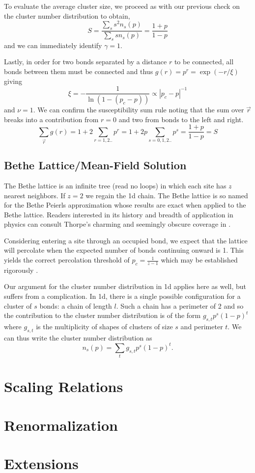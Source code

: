 To evaluate the average cluster size, we proceed as with our previous check on
the cluster number distribution to obtain,
\[S = \frac{\sum_s s^2n_s(p)}{\sum_s sn_s(p)} = \frac{1+p}{1-p}\]
and we can immediately identify $\gamma=1$.

Lastly, in order for two bonds separated by a distance $r$ to be connected, all
bonds between them must be connected and thus \(g(r) = p^r = \exp(-r/\xi)\) giving
\[\xi = -\frac{1}{\ln(1 - (p_c - p))}\propto |p_c - p|^{-1}\]
and $\nu = 1$.  We can confirm the susceptibility sum rule noting that the sum over
$\vec{r}$ breaks into a contribution from $r=0$ and two from bonds to the left and
right.
\[\sum_{\vec{r}}g(r) = 1 + 2\sum_{r=1,2..} p^r = 
1 + 2p\sum_{s=0,1,2..} p^s= \frac{1+p}{1-p} = S\]

\subsection{Bethe Lattice/Mean-Field Solution}

The Bethe lattice is an infinite tree (read no loops) in which each site has
$z$ nearest neighbors.  If $z=2$ we regain the 1d chain. The Bethe lattice is 
so named for the Bethe Peierls
approximation whose results are exact when applied to the Bethe lattice.
Readers interested in its history and breadth of application in physics
can consult Thorpe's charming and seemingly obscure coverage in \cite{thorpe82}.

Considering entering a site through an occupied bond, we expect that the lattice will
percolate when the expected number of bonds continuing onward is 1.  This yields the
correct percolation threshold of $p_c = \frac{1}{z-1}$ which may be established
rigorously \cite{fisher61}.

Our argument for the cluster number distribution in 1d applies here as well,
but suffers from a complication.  In 1d, there is a single possible
configuration for a cluster of $s$ bonds: a chain of length $l$.  Such a chain
has a perimeter of 2 and so the contribution to the cluster number
distribution is of the form $g_{s,t}p^s(1-p)^t$ where $g_{s,t}$ is the
multiplicity of shapes of clusters of size $s$ and perimeter $t$.  We can
thus write the cluster number distribution as
\[n_s(p) = \sum_t g_{s,t}p^s(1-p)^t.\]


\section{Scaling Relations}
\section{Renormalization}
\section{Extensions}

